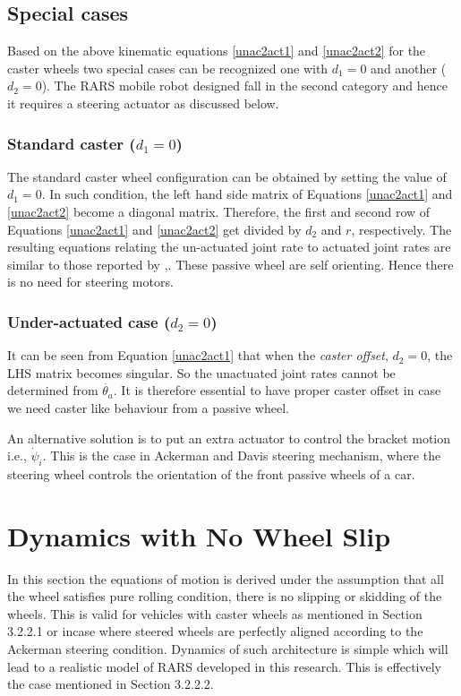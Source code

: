 \subsection{Special cases}
Based on the above kinematic equations \ref{unac2act1} and \ref{unac2act2} for the caster wheels two special cases can be recognized one with $d_1=0$ and another ($d_2=0$). The RARS mobile robot designed fall in the second category and hence it requires a steering actuator as discussed below.  
\subsubsection{Standard caster ($d_1=0$) }
The  standard caster wheel configuration can be obtained by setting the value of $d_1=0$. In such condition, the left hand side matrix of  Equations \ref{unac2act1} and \ref{unac2act2} become  a diagonal matrix. Therefore, the first and second row of Equations \ref{unac2act1} and \ref{unac2act2} get divided by $d_2$ and $r$, respectively. The resulting  equations relating the un-actuated joint rate to  actuated joint rates are similar to those reported by \cite{saha1991dynamics},\cite{angeles2013fundamentals}. These passive wheel are self orienting. Hence there is no need for steering motors. 
\subsubsection{Under-actuated case ($d_2=0$)}
It can be seen from Equation \ref{unac2act1} that when the \textit{caster offset}, $d_2=0$, the LHS matrix becomes singular. So the unactuated joint rates cannot be determined from $\dot{\theta_a}$. It is therefore essential to have proper caster offset in case we need caster like behaviour from a passive wheel. 

An alternative solution is to put an extra actuator to control the bracket motion i.e., $\dot\psi_i$. This is the case in Ackerman and Davis steering mechanism, where the steering wheel controls the orientation of the front passive wheels of a car.
\section{Dynamics with No Wheel Slip }
In this section the equations of motion is derived under the assumption that all the wheel satisfies pure rolling condition, there is no slipping or skidding of the wheels. This is valid for vehicles with caster wheels as mentioned in Section 3.2.2.1 or incase where steered wheels are perfectly aligned according to the Ackerman steering condition. Dynamics of such architecture is simple which will lead to a realistic model of RARS developed in this research. This is effectively the case mentioned in Section 3.2.2.2. 


